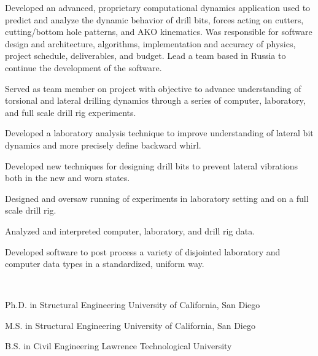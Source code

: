 \documentclass{resume}
\begin{document}
		\begin{bulletedlist}
			
		\item 
					Developed an advanced, proprietary computational dynamics application used to predict and analyze the dynamic behavior of drill bits, forces acting on cutters, cutting/bottom hole patterns, and AKO kinematics.  Was responsible for software design and architecture, algorithms, implementation and accuracy of physics, project schedule, deliverables, and budget.  Lead a team based in Russia to continue the development of the software.
		\item Served as team member on project with objective to advance understanding of torsional and lateral drilling dynamics through a series of computer, laboratory, and full scale drill rig experiments.
		\item Developed a laboratory analysis technique to improve understanding of lateral bit dynamics and more precisely define backward whirl.
		\item Developed new techniques for designing drill bits to prevent lateral vibrations both in the new and worn states.
		\item Designed and oversaw running of experiments in laboratory setting and on a full scale drill rig.
		\item Analyzed and interpreted computer, laboratory, and drill rig data.
		\item Developed software to post process a variety of disjointed laboratory and computer data types in a standardized, uniform way.
		\end{bulletedlist}
			\vspace*{-12pt}
	\hspace*{0pt}\\ \vspace*{-2pt}
				
		\vspace*{-8pt}
	

	
                {Ph.D. in Structural Engineering}
                {University of California, San Diego}
		
                {M.S. in Structural Engineering}
                {University of California, San Diego}
		
                {B.S. in Civil Engineering}
                {Lawrence Technological University}
		
\end{document}
